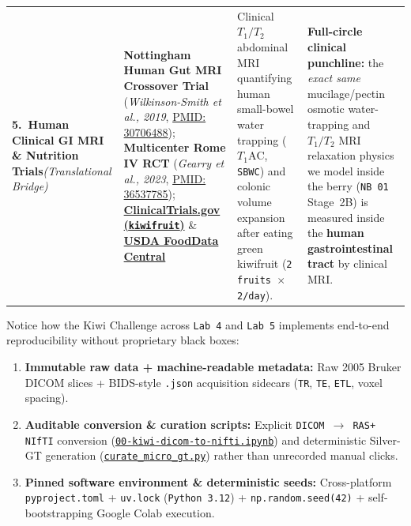 \documentclass[10pt,a4paper]{article}
\newcommand{\ghblob}{https://github.com/arvidl/BMED365-2027/blob/main}
\begin{document}
{\begin{xltabular}{\textwidth}{L{2.55cm} L{4.85cm} L{4.25cm} Y}
\textbf{5.\ Human Clinical GI MRI \& Nutrition Trials}\newline \textit{(Translational Bridge)} &
\textbf{Nottingham Human Gut MRI Crossover Trial} (\textit{Wilkinson-Smith et al., 2019}, \href{https://pubmed.ncbi.nlm.nih.gov/30706488/}{PMID: 30706488}); \textbf{Multicenter Rome IV RCT} (\textit{Gearry et al., 2023}, \href{https://pubmed.ncbi.nlm.nih.gov/36537785/}{PMID: 36537785}); \href{https://clinicaltrials.gov/search?intr=kiwifruit}{\textbf{ClinicalTrials.gov (\texttt{kiwifruit})}} \& \href{https://fdc.nal.usda.gov/}{\textbf{USDA FoodData Central}} &
Clinical $T_1 / T_2$ abdominal MRI quantifying human small-bowel water trapping ($T_1\text{AC}$, \texttt{SBWC}) and colonic volume expansion after eating green kiwifruit (\texttt{2 fruits $\times$ 2/day}). &
\textbf{Full-circle clinical punchline:} the \textit{exact same} mucilage/pectin osmotic water-trapping and $T_1/T_2$ MRI relaxation physics we model inside the berry (\texttt{NB 01} Stage~2B) is measured inside the \textbf{human gastrointestinal tract} by clinical MRI. \\
\end{xltabular}
}

\begin{kiwibox}
Notice how the Kiwi Challenge across \texttt{Lab 4} and \texttt{Lab 5} implements end-to-end reproducibility without proprietary black boxes:
\begin{enumerate}
    \item \textbf{Immutable raw data + machine-readable metadata:} Raw 2005 Bruker DICOM slices + BIDS-style \texttt{.json} acquisition sidecars (\texttt{TR}, \texttt{TE}, \texttt{ETL}, voxel spacing).
    \item \textbf{Auditable conversion \& curation scripts:} Explicit \texttt{DICOM $\to$ RAS+ NIfTI} conversion (\href{\ghblob/Lab4-Comp-Imag/Kiwi-challenge/notebooks/00-kiwi-dicom-to-nifti.ipynb}{\texttt{00-kiwi-dicom-to-nifti.ipynb}}) and deterministic Silver-GT generation (\href{\ghblob/Lab4-Comp-Imag/Kiwi-challenge/scripts/curate_micro_gt.py}{\texttt{curate\_micro\_gt.py}}) rather than unrecorded manual clicks.
    \item \textbf{Pinned software environment \& deterministic seeds:} Cross-platform \texttt{pyproject.toml} + \texttt{uv.lock} (\texttt{Python 3.12}) + \texttt{np.random.seed(42)} + self-bootstrapping Google Colab execution.
\end{enumerate}
\end{kiwibox}
\end{document}
